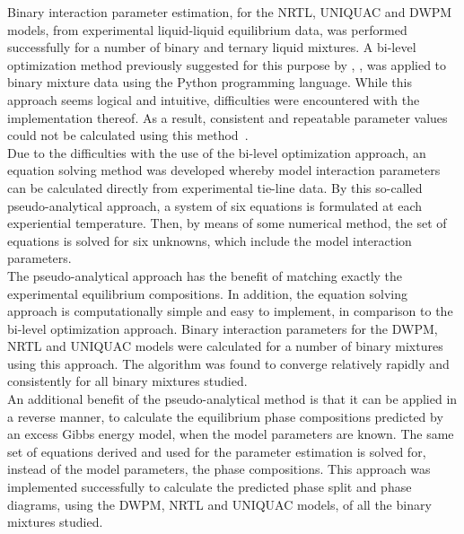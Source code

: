 
Binary interaction parameter estimation, for the NRTL, UNIQUAC and DWPM models, from experimental liquid-liquid equilibrium data, was performed successfully for a number of binary and ternary liquid mixtures. A bi-level optimization method previously suggested for this purpose by \citeauthor{BilevelOptimization2}, \citeyear{BilevelOptimization2}, was applied to binary mixture data using the Python programming language. While this approach seems logical and intuitive, difficulties were encountered with the implementation thereof. As a result, consistent and repeatable parameter values could not be calculated using this method~\cite{BilevelOptimization2}.\\

Due to the difficulties with the use of the bi-level optimization approach, an equation solving method was developed whereby model interaction parameters can be calculated directly from experimental tie-line data. By this so-called pseudo-analytical approach, a system of six equations is formulated at each experiential temperature. Then, by means of some numerical method, the set of equations is solved for six unknowns, which include the model interaction parameters.\\

The pseudo-analytical approach has the benefit of matching exactly the experimental equilibrium compositions. In addition, the equation solving approach is computationally simple and easy to implement, in comparison to the bi-level optimization approach. Binary interaction parameters for the DWPM, NRTL and UNIQUAC models were calculated for a number of binary mixtures using this approach. The algorithm was found to converge relatively rapidly and consistently for all binary mixtures studied.\\

An additional benefit of the pseudo-analytical method is that it can be applied in a reverse manner, to calculate the equilibrium phase compositions predicted by an excess Gibbs energy model, when the model parameters are known. The same set of equations derived and used for the parameter estimation is solved for, instead of the model parameters, the phase compositions. This approach was implemented successfully to calculate the predicted phase split and phase diagrams, using the DWPM, NRTL and UNIQUAC models, of all the binary mixtures studied.\\

